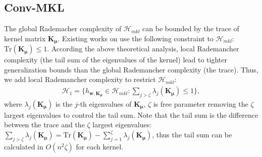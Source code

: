 \documentclass{article}
\begin{document}
\subsection{Conv-MKL}
The global Rademacher complexity of $\mathcal{H}_{mkl}$ can be bounded by the trace of kernel matrix $\mathbf{K}_{\bm \mu}$.
Existing works on \cite{LanckrietCBGJ02,BachLJ04,SonnenburgRSS06} use the following constraint to $\mathcal{H}_{mkl}$:
$\mathrm{Tr}(\mathbf{K}_{\bm \mu}) \leq 1.$
According the above theoretical analysis,
local Rademancher complexity (the tail sum of the eigenvalues of the kernel) lead to
tighter generalization bounds than the global Rademancher complexity (the trace).
Thus, we add local Rademancher complexity to restrict $\mathcal{H}_{mkl}$:
\begin{align}
    \mathcal{H}_{1}=\Big\{h_{\mathbf{w}, \mathbf{K}_{\bm \mu}} \in \mathcal{H}_{mkl}:\sum_{j > \zeta} \lambda_j(\mathbf{K}_{\bm \mu}) \leq 1\Big\},
\end{align}
where $\lambda_j(\mathbf K_{\bm \mu})$ is the $j$-th eigenvalues of $\mathbf K_{\bm \mu}$,
$\zeta$ is free parameter removing the $\zeta$ largest eigenvalues to control the tail sum.
Note that the tail sum is the difference between the trace and
the $\zeta$ largest eigenvalues: $\sum_{j>\zeta}\lambda_j(\mathbf{K}_{\bm \mu})=\mathrm{Tr}(\mathbf{K}_{\bm \mu})-\sum_{j=1}^\zeta\lambda_j(\mathbf{K}_{\bm \mu})$,
thus the tail sum can be calculated in $O(n^2\zeta)$ for each kernel.
\end{document}
